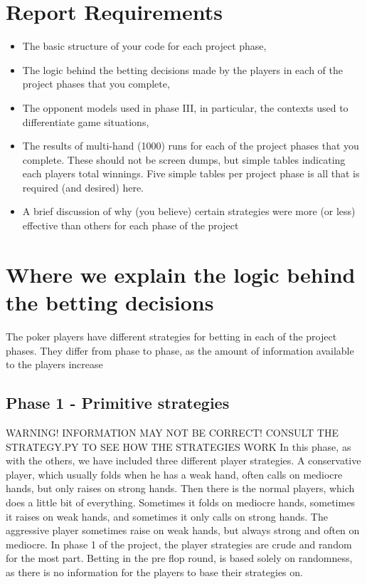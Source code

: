 \documentclass[titlepage]{article}
\begin{document}
\section{Report Requirements}
	\begin{itemize}
		\item The basic structure of your code for each project phase,

		\item The logic behind the betting decisions made by the players in each of the project phases that you complete,

		\item The opponent models used in phase III, in particular, the contexts used to 	differentiate game situations,

		\item The results of multi-hand (1000) runs for each of the project phases that you 	complete. These should not be screen dumps, but simple tables indicating each players total winnings. Five simple tables per project phase is all that is required (and desired) here.

		\item A brief discussion of why (you believe) certain strategies were more (or less) effective than others for each phase of the project
	\end{itemize}

\section{Where we explain the logic behind the betting decisions}
	The poker players have different strategies for betting in each of the project phases. They differ from phase to phase, as the amount of information available to the players increase
	
	\subsection{Phase 1 - Primitive strategies}
		WARNING! INFORMATION MAY NOT BE CORRECT! CONSULT THE STRATEGY.PY TO SEE HOW THE 	STRATEGIES WORK
In this phase, as with the others, we have included three different player strategies. A 		conservative player, which usually folds when he has a weak hand, often calls on mediocre hands, 	but only raises on strong hands. Then there is the normal players, which does a little bit of 		everything. Sometimes it folds on mediocre hands, sometimes it raises on weak hands, and 		sometimes it only calls on strong hands. The aggressive player sometimes raise on weak hands, but always strong and often on mediocre. In phase 1 of the project, the player strategies are crude and random for the most part. Betting 	in the pre flop round, is based solely on randomness, as there is no information for the players to base their strategies on. 
	
\end{document}
